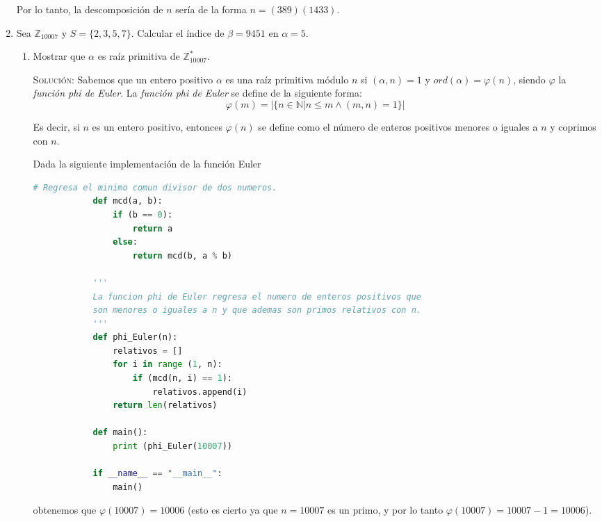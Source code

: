 \documentclass[letterpaper,11pt]{article}
\begin{document}
\begin{enumerate}
    Por lo tanto, la descomposición de $n$ sería de la forma $n = (389)(1433)$.
    
    \item Sea $\mathbb{Z}_{10007}$ y $S = \{2, 3, 5, 7\}$. Calcular el índice 
    de $\beta = 9451$ en $\alpha = 5$.
    \begin{enumerate}
        \item Mostrar que $\alpha$ es raíz primitiva de $\mathbb{Z}^{*}_{10007}$.

        \textsc{Solución:} Sabemos que un entero positivo $\alpha$ es una raíz 
        primitiva módulo $n$ si $(\alpha, n) = 1$ y $ord(\alpha) = \varphi(n)$,
        siendo $\varphi$ la \textit{función phi de Euler}.
        La \textit{función phi de Euler} se define de la siguiente forma:
        \begin{equation*}
            \varphi(m) = |\{n \in \mathbb{N} | n \leq m \land (m, n) = 1 \}|
        \end{equation*}

        Es decir, si $n$ es un entero positivo, entonces $\varphi(n)$ se 
        define como el número de enteros positivos menores o iguales a $n$ y 
        coprimos con $n$. 
        
        Dada la siguiente implementación de la función Euler
        \begin{lstlisting}[language=Python]
            # Regresa el minimo comun divisor de dos numeros. 
            def mcd(a, b):
                if (b == 0):
                    return a 
                else:
                    return mcd(b, a % b)
            
            '''
            La funcion phi de Euler regresa el numero de enteros positivos que 
            son menores o iguales a n y que ademas son primos relativos con n. 
            '''
            def phi_Euler(n):
                relativos = []
                for i in range (1, n):
                    if (mcd(n, i) == 1):
                        relativos.append(i)
                return len(relativos)
            
            def main():
                print (phi_Euler(10007))
            
            if __name__ == "__main__":
                main()
        \end{lstlisting}
        
        obtenemos que $\varphi(10007) = 10006$ (esto es cierto ya que $n = 10007$ 
        es un primo, y por lo tanto $\varphi(10007) = 10007 - 1 = 10006$). 
        

\end{enumerate}
\end{enumerate}
\end{document}

